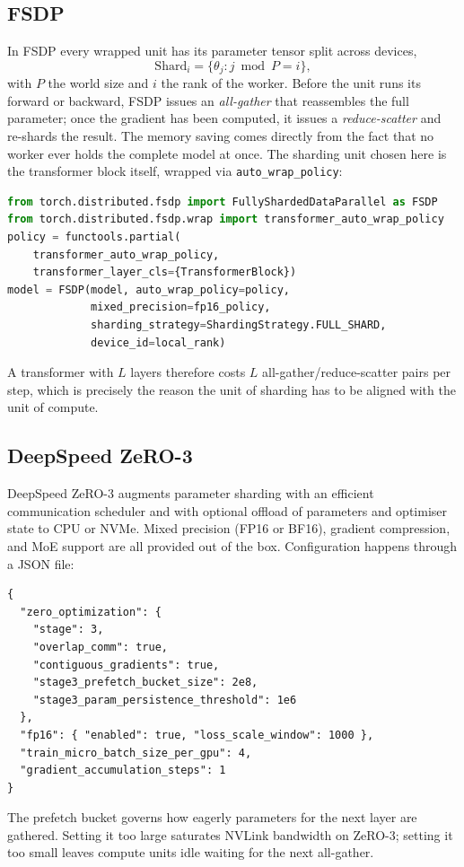 \subsection{FSDP}\label{sec:impl_fsdp}
In FSDP every wrapped unit has its parameter tensor split across
devices,
\begin{equation}
    \mathrm{Shard}_i = \{\theta_j : j \bmod P = i\},
\end{equation}
with $P$ the world size and $i$ the rank of the worker. Before the
unit runs its forward or backward, FSDP issues an
\emph{all-gather} that reassembles the full parameter; once the
gradient has been computed, it issues a \emph{reduce-scatter} and
re-shards the result. The memory saving comes directly from the
fact that no worker ever holds the complete model at once. The
sharding unit chosen here is the transformer block itself, wrapped
via \texttt{auto\_wrap\_policy}:
\begin{lstlisting}[language=Python]
from torch.distributed.fsdp import FullyShardedDataParallel as FSDP
from torch.distributed.fsdp.wrap import transformer_auto_wrap_policy
policy = functools.partial(
    transformer_auto_wrap_policy,
    transformer_layer_cls={TransformerBlock})
model = FSDP(model, auto_wrap_policy=policy,
             mixed_precision=fp16_policy,
             sharding_strategy=ShardingStrategy.FULL_SHARD,
             device_id=local_rank)
\end{lstlisting}
A transformer with $L$ layers therefore costs $L$
all-gather/reduce-scatter pairs per step, which is precisely the
reason the unit of sharding has to be aligned with the unit of
compute.

\subsection{DeepSpeed ZeRO-3}\label{sec:impl_ds}
DeepSpeed ZeRO-3 augments parameter sharding with an efficient
communication scheduler and with optional offload of parameters
and optimiser state to CPU or NVMe. Mixed precision (FP16 or
BF16), gradient compression, and MoE support are all provided
out of the box. Configuration happens through a JSON file:
\begin{lstlisting}[basicstyle=\ttfamily\scriptsize]
{
  "zero_optimization": {
    "stage": 3,
    "overlap_comm": true,
    "contiguous_gradients": true,
    "stage3_prefetch_bucket_size": 2e8,
    "stage3_param_persistence_threshold": 1e6
  },
  "fp16": { "enabled": true, "loss_scale_window": 1000 },
  "train_micro_batch_size_per_gpu": 4,
  "gradient_accumulation_steps": 1
}
\end{lstlisting}
The prefetch bucket governs how eagerly parameters for the next
layer are gathered. Setting it too large saturates NVLink
bandwidth on ZeRO-3; setting it too small leaves compute units
idle waiting for the next all-gather.

